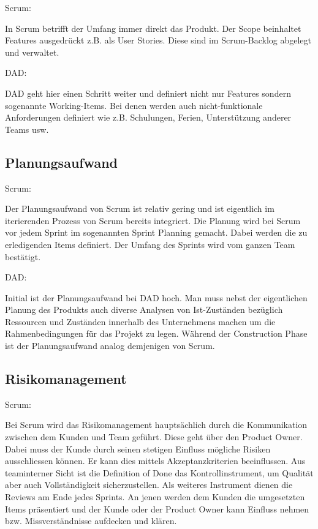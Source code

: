 {\Large Scrum:} \medskip

In Scrum betrifft der Umfang immer direkt das Produkt. Der Scope beinhaltet Features ausgedrückt z.B. als User Stories. Diese sind im Scrum-Backlog abgelegt und verwaltet.
\bigskip 

{\Large DAD:} \cite{planningScopeDad} \medskip

DAD geht hier einen Schritt weiter und definiert nicht nur Features sondern sogenannte Working-Items. Bei denen werden auch nicht-funktionale Anforderungen definiert wie z.B. Schulungen, Ferien, Unterstützung anderer Teams usw.	


\subsection{Planungsaufwand}

{\Large Scrum:} \medskip

Der Planungsaufwand von Scrum ist relativ gering und ist eigentlich im iterierenden Prozess von Scrum bereits integriert. Die Planung wird bei Scrum vor jedem Sprint im sogenannten Sprint Planning gemacht. Dabei werden die zu erledigenden Items definiert. Der Umfang des Sprints wird vom ganzen Team bestätigt.\bigskip 

{\Large DAD:} \medskip

Initial ist der Planungsaufwand bei DAD hoch. Man muss nebst der eigentlichen Planung des Produkts auch diverse Analysen von Ist-Zuständen bezüglich Ressourcen und Zuständen innerhalb des Unternehmens machen um die Rahmenbedingungen für das Projekt zu legen. Während der Construction Phase ist der Planungsaufwand analog demjenigen von Scrum.


\subsection{Risikomanagement}

{\Large Scrum:} \medskip

Bei Scrum wird das Risikomanagement hauptsächlich durch die Kommunikation zwischen dem Kunden und Team geführt. Diese geht über den Product Owner. Dabei muss der Kunde durch seinen stetigen Einfluss mögliche Risiken ausschliessen können. Er kann dies mittels Akzeptanzkriterien beeinflussen.\newline
Aus teaminterner Sicht ist die Definition of Done das Kontrollinstrument, um Qualität aber auch Vollständigkeit sicherzustellen.
Als weiteres Instrument dienen die Reviews am Ende jedes Sprints. An jenen werden dem Kunden die umgesetzten Items präsentiert und der Kunde oder der Product Owner kann Einfluss nehmen bzw. Missverständnisse aufdecken und klären.

